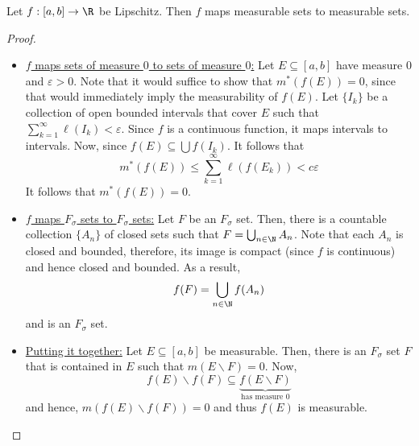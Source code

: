 \begin{theorem}
    Let $f:[a,b]\to\R$ be Lipschitz. Then $f$ maps measurable sets to measurable sets.
\end{theorem}
\begin{proof}
\hfill 
\begin{itemize}
    \item \underline{$f$ maps sets of measure $0$ to sets of measure $0$:} Let $E\subseteq[a,b]$ have measure $0$ and $\varepsilon > 0$. Note that it would suffice to show that $m^*(f(E)) = 0$, since that would immediately imply the measurability of $f(E)$. 
    Let $\{I_k\}$ be a collection of open bounded intervals that cover $E$ such that $\sum_{k = 1}^\infty \ell(I_k) < \varepsilon$. Since $f$ is a continuous function, it maps intervals to intervals. Now, since $f(E)\subseteq\bigcup f(I_k)$. It follows that 
    \begin{equation*}
        m^*(f(E))\le\sum_{k = 1}^\infty\ell(f(E_k)) < c\varepsilon
    \end{equation*}
    It follows that $m^*(f(E)) = 0$.

    \item \underline{$f$ maps $F_\sigma$ sets to $F_\sigma$ sets:} Let $F$ be an $F_\sigma$ set. Then, there is a countable collection $\{A_n\}$ of closed sets such that $F = \bigcup_{n\in\N} A_n$. Note that each $A_n$ is closed and bounded, therefore, its image is compact (since $f$ is continuous) and hence closed and bounded. As a result, 
    \begin{equation*}
        f(F) = \bigcup_{n\in\N} f(A_n)
    \end{equation*}
    and is an $F_\sigma$ set.

    \item \underline{Putting it together:} Let $E\subseteq[a,b]$ be measurable. Then, there is an $F_\sigma$ set $F$ that is contained in $E$ such that $m(E\backslash F) = 0$. Now,
    \begin{equation*}
        f(E)\backslash f(F)\subseteq \underbrace{f(E\backslash F)}_{\text{has measure $0$}}
    \end{equation*}
    and hence, $m(f(E)\backslash f(F)) = 0$ and thus $f(E)$ is measurable.
\end{itemize}
\end{proof}

